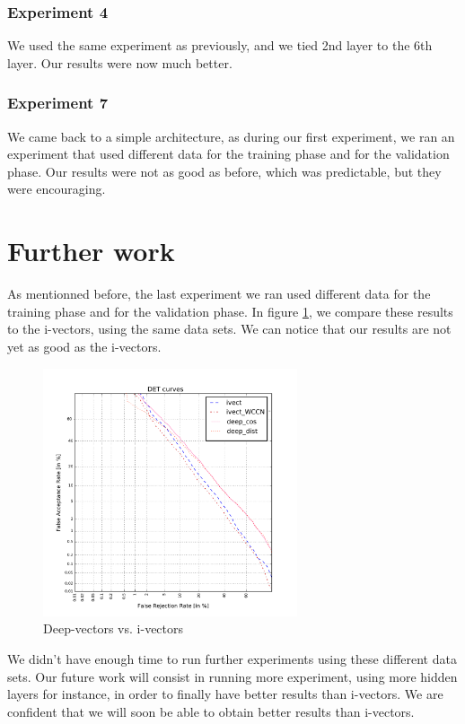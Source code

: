 \documentclass[conference]{IEEEtran}
\begin{document}
\subsubsection{Experiment 4} We used the same experiment as previously, and we tied 2nd layer to the 6th layer. Our results were now much better.

\subsubsection{Experiment 7} We came back to a simple architecture, as during our first experiment, we ran an experiment that used different data for the training phase and for the validation phase. Our results were not as good as before, which was predictable, but they were encouraging.



\section{Further work}
\label{sec:Further}

As mentionned before, the last experiment we ran used different data for the training phase and for the validation phase. In figure \ref{exp7ivectors}, we compare these results to the i-vectors, using the same data sets. We can notice that our results are not yet as good as the i-vectors.


\begin{figure}[!h]
    \centering
    \includegraphics[width=7.5cm]{../scores/exp7_et_gabi.pdf}
    \caption{Deep-vectors vs. i-vectors}
	\label{exp7ivectors}
\end{figure}

We didn't have enough time to run further experiments using these different data sets. Our future work will consist in running more experiment, using more hidden layers for instance, in order to finally have better results than i-vectors. We are confident that we will soon be able to obtain better results than i-vectors.
\end{document}
